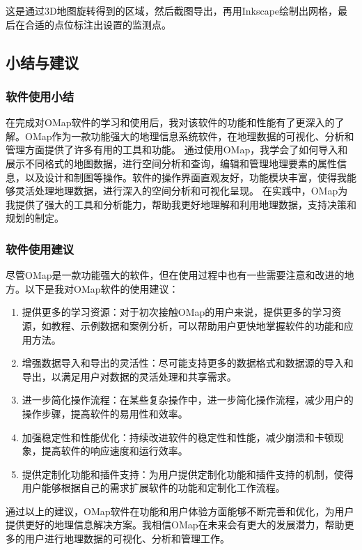 \documentclass{cdut_thesis_twoside}
\begin{document}
这是通过3D地图旋转得到的区域，然后截图导出，再用Inkscape绘制出网格，最后在合适的点位标注出设置的监测点。


\subsection{小结与建议}
\subsubsection{软件使用小结}
在完成对OMap软件的学习和使用后，我对该软件的功能和性能有了更深入的了解。OMap作为一款功能强大的地理信息系统软件，在地理数据的可视化、分析和管理方面提供了许多有用的工具和功能。
通过使用OMap，我学会了如何导入和展示不同格式的地图数据，进行空间分析和查询，编辑和管理地理要素的属性信息，以及设计和制图等操作。软件的操作界面直观友好，功能模块丰富，使得我能够灵活处理地理数据，进行深入的空间分析和可视化呈现。
在实践中，OMap为我提供了强大的工具和分析能力，帮助我更好地理解和利用地理数据，支持决策和规划的制定。


\subsubsection{软件使用建议}

尽管OMap是一款功能强大的软件，但在使用过程中也有一些需要注意和改进的地方。以下是我对OMap软件的使用建议：
\begin{enumerate}
    \item 提供更多的学习资源：对于初次接触OMap的用户来说，提供更多的学习资源，如教程、示例数据和案例分析，可以帮助用户更快地掌握软件的功能和应用方法。
    \item 增强数据导入和导出的灵活性：尽可能支持更多的数据格式和数据源的导入和导出，以满足用户对数据的灵活处理和共享需求。
    \item 进一步简化操作流程：在某些复杂操作中，进一步简化操作流程，减少用户的操作步骤，提高软件的易用性和效率。
    \item 加强稳定性和性能优化：持续改进软件的稳定性和性能，减少崩溃和卡顿现象，提高软件的响应速度和运行效率。
    \item 提供定制化功能和插件支持：为用户提供定制化功能和插件支持的机制，使得用户能够根据自己的需求扩展软件的功能和定制化工作流程。
\end{enumerate}

通过以上的建议，OMap软件在功能和用户体验方面能够不断完善和优化，为用户提供更好的地理信息解决方案。我相信OMap在未来会有更大的发展潜力，帮助更多的用户进行地理数据的可视化、分析和管理工作。
\end{document}
